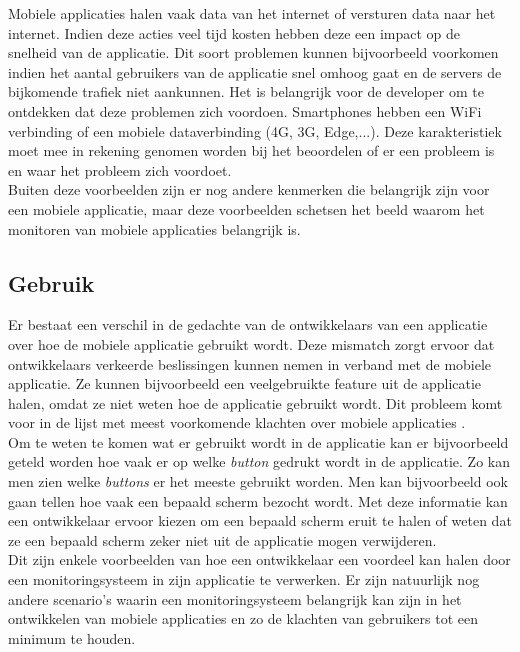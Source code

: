 Mobiele applicaties halen vaak data van het internet of versturen data naar het internet. Indien deze acties veel tijd kosten hebben deze een impact op de snelheid van de applicatie. Dit soort problemen kunnen bijvoorbeeld voorkomen indien het aantal gebruikers van de applicatie snel omhoog gaat en de servers de bijkomende trafiek niet aankunnen. Het is belangrijk voor de developer om te ontdekken dat deze problemen zich voordoen. Smartphones hebben een WiFi verbinding of een mobiele dataverbinding (4G, 3G, Edge,...). Deze karakteristiek moet mee in rekening genomen worden bij het beoordelen of er een probleem is en waar het probleem zich voordoet.\\


Buiten deze voorbeelden zijn er nog andere kenmerken die belangrijk zijn voor een mobiele applicatie, maar deze voorbeelden schetsen het beeld waarom het monitoren van mobiele applicaties belangrijk is.

\subsection{Gebruik}
Er bestaat een verschil in de gedachte van de ontwikkelaars van een applicatie over hoe de mobiele applicatie gebruikt wordt. Deze mismatch zorgt ervoor dat ontwikkelaars verkeerde beslissingen kunnen nemen in verband met de mobiele applicatie. Ze kunnen bijvoorbeeld een veelgebruikte feature uit de applicatie halen, omdat ze niet weten hoe de applicatie gebruikt wordt. Dit probleem komt voor in de lijst met meest voorkomende klachten over mobiele applicaties \cite{AppSucks}. \\

Om te weten te komen wat er gebruikt wordt in de applicatie kan er bijvoorbeeld geteld worden hoe vaak er op welke \textit{button} gedrukt wordt in de applicatie. Zo kan men zien welke \textit{buttons} er het meeste gebruikt worden. Men kan bijvoorbeeld ook gaan tellen hoe vaak een bepaald scherm bezocht wordt. Met deze informatie kan een ontwikkelaar ervoor kiezen om een bepaald scherm eruit te halen of weten dat ze een bepaald scherm zeker niet uit de applicatie mogen verwijderen. \\


Dit zijn enkele voorbeelden van hoe een ontwikkelaar een voordeel kan halen door een monitoringsysteem in zijn applicatie te verwerken. Er zijn natuurlijk nog andere scenario's waarin een monitoringsysteem belangrijk kan zijn in het ontwikkelen van mobiele applicaties en zo de klachten van gebruikers tot een minimum te houden.